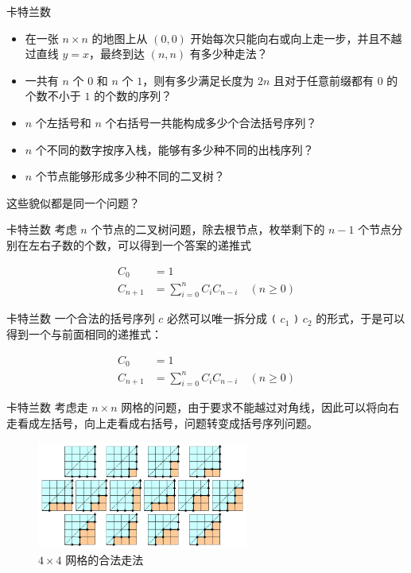 \documentclass[12pt,aspectratio=169]{beamer}
\begin{document}
\begin{frame}[fragile]{卡特兰数}
\begin{itemize}
  \item 在一张 $n \times n$ 的地图上从 $(0, 0)$ 开始每次只能向右或向上走一步，并且不越过直线 $y=x$，最终到达 $(n, n)$ 有多少种走法？
  \item 一共有 $n$ 个 $0$ 和 $n$ 个 $1$，则有多少满足长度为 $2n$ 且对于任意前缀都有 $0$ 的个数不小于 $1$ 的个数的序列？
  \item $n$ 个左括号和 $n$ 个右括号一共能构成多少个合法括号序列？
  \item $n$ 个不同的数字按序入栈，能够有多少种不同的出栈序列？
  \item $n$ 个节点能够形成多少种不同的二叉树？
\end{itemize}
\pause

这些貌似都是同一个问题？
\end{frame}

\begin{frame}[fragile]{卡特兰数}
考虑 $n$ 个节点的二叉树问题，除去根节点，枚举剩下的 $n-1$ 个节点分别在左右子数的个数，可以得到一个答案的递推式

$$
\begin{aligned}
C_{0} &= 1 \\
C_{n+1} &= \sum_{i=0}^{n} C_{i} C_{n-i} \quad (n \ge 0)
\end{aligned}
$$
\end{frame}

\begin{frame}[fragile]{卡特兰数}
一个合法的括号序列 $c$ 必然可以唯一拆分成 \verb|(| $c_1$ \verb|)| $c_2$ 的形式，于是可以得到一个与前面相同的递推式：

$$
\begin{aligned}
C_{0} &= 1 \\
C_{n+1} &= \sum_{i=0}^{n} C_{i} C_{n-i} \quad (n \ge 0)
\end{aligned}
$$
\end{frame}

\begin{frame}[fragile]{卡特兰数}
考虑走 $n \times n$ 网格的问题，由于要求不能越过对角线，因此可以将向右走看成左括号，向上走看成右括号，问题转变成括号序列问题。

\begin{figure}
  \centering
  \includegraphics[height=100pt]{walk.png}
  \caption{$4 \times 4$ 网格的合法走法}
\end{figure}
\end{frame}
\end{document}
